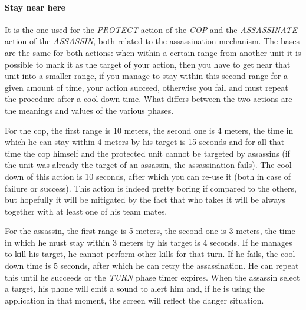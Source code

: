 				\paragraph{Stay near here}
				It is the one used for the \emph{PROTECT} action of the \emph{COP} and the \emph{ASSASSINATE} action of the \emph{ASSASSIN}, both related to the assassination mechanism.
				The bases are the same for both actions: when within a certain range from another unit it is possible to mark it as the target of your action, then you have to get near that unit into a smaller range, if you manage to stay within this second range for a given amount of time, your action succeed, otherwise you fail and must repeat the procedure after a cool-down time.
				What differs between the two actions are the meanings and values of the various phases.
				
				
				For the cop, the first range is 10 meters, the second one is 4 meters, the time in which he can stay within 4 meters by his target is 15 seconds and for all that time the cop himself and the protected unit cannot be targeted by assassins (if the unit was already the target of an assassin, the assassination fails). The cool-down of this action is 10 seconds, after which you can re-use it (both in case of failure or success).
				This action is indeed pretty boring if compared to the others, but hopefully it will be mitigated by the fact that who takes it will be always together with at least one of his team mates.
				
				
				For the assassin, the first range is 5 meters, the second one is 3 meters, the time in which he must stay within 3 meters by his target is 4 seconds. If he manages to kill his target, he cannot perform other kills for that turn. If he fails, the cool-down time is 5 seconds, after which he can retry the assassination. He can repeat this until he succeeds or the \emph{TURN} phase timer expires.
				When the assassin select a target, his phone will emit a sound to alert him and, if he is using the application in that moment, the screen will reflect the danger situation.
				
				
